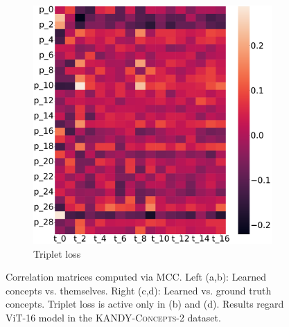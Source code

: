 \begin{figure}
\begin{minipage}{.49\textwidth}
\begin{subfigure}{.49\textwidth}
	\includegraphics[width=\textwidth]{imgs/cem/KANDY_2-vit-continual-triplet_pt.pdf}
	\caption{Triplet loss}
\end{subfigure}
\end{minipage}
 
\caption[Concept correlation matrices for \textsc{KANDY-Concepts-2} (ViT-16)]{Correlation matrices computed via {\small\sc MCC}. Left (a,b): Learned concepts vs. themselves. Right (c,d): Learned vs. ground truth concepts. Triplet loss is active only in (b) and (d). Results regard ViT-16 model in the \textsc{KANDY-Concepts-2} dataset.
}
\label{cem:fig:mcc}
\end{figure}
